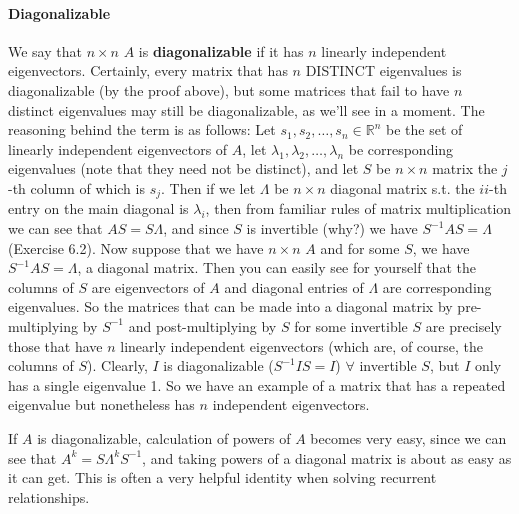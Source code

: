 \documentclass[12pt,oneside]{article}
\begin{document}
\paragraph{Diagonalizable}
We say that $n \times n$ $A$ is \textbf{diagonalizable} if it has $n$
linearly independent eigenvectors. Certainly, every matrix that has
$n$ DISTINCT eigenvalues is diagonalizable (by the proof above), but
some matrices that fail to have $n$ distinct eigenvalues may still be
diagonalizable, as we'll see in a moment. The reasoning behind the
term is as follows: Let $s_1, s_2, \ldots, s_n \in {\mathbb{R}}^n$ be
the set of linearly independent eigenvectors of $A$, let $\lambda_1,
\lambda_2, \ldots, \lambda_n$ be corresponding eigenvalues (note that
they need not be distinct), and let $S$ be $n \times n$ matrix the $j$-th
column of which is $s_j$. Then if we let $\Lambda$ be $n \times n$
diagonal matrix s.t. the $ii$-th entry on the main diagonal is
$\lambda_i$, then from familiar rules of matrix multiplication we
can see that $AS = S \Lambda$, and since $S$ is invertible (why?) we
have $S^{-1} A S = \Lambda$ (Exercise 6.2). Now suppose that we have $n \times n$ $A$
and for some $S$, we have $S^{-1} A S = \Lambda$, a diagonal
matrix. Then you can easily see for yourself that the columns of $S$
are eigenvectors of $A$ and diagonal entries of $\Lambda$ are
corresponding eigenvalues. So the matrices that can be made into a
diagonal matrix by pre-multiplying by $S^{-1}$ and post-multiplying by
$S$ for some invertible $S$ are precisely those that have $n$ linearly
independent eigenvectors (which are, of course, the columns of
$S$). Clearly, $I$ is diagonalizable ($S^{-1} I S = I$) $\forall$
invertible $S$, but $I$ only has a single eigenvalue 1. So we have an
example of a matrix that has a repeated eigenvalue but nonetheless has
$n$ independent eigenvectors.

If $A$ is diagonalizable, calculation of powers of $A$ becomes very
easy, since we can see that $A^k = S \Lambda^k S^{-1}$, and taking
powers of a diagonal matrix is about as easy as it can get. This is often
a very helpful identity when solving recurrent relationships.
\\
\end{document}
